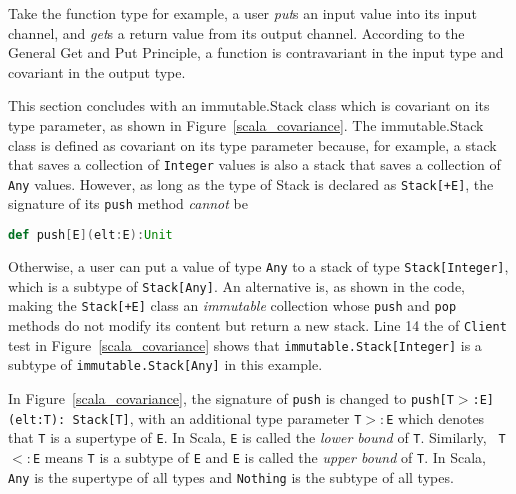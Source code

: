 Take the function type for example, a user {\it put}s an input value into 
its input channel, and {\it get}s a return value from its output channel.  
According to the General Get and Put Principle, a function is contravariant in 
the input type and covariant in the output type.

This section concludes with an immutable.Stack class which is covariant on its type 
parameter, as shown in Figure~\ref{scala_covariance}.  The immutable.Stack class 
is defined as covariant on  its type parameter because, for example, a stack 
that saves a collection of {\tt Integer} values is also a stack that saves a collection of {\tt Any} 
values.  However, as long as the type of Stack is declared as {\tt Stack[+E]}, the 
signature of its {\tt push} method {\it cannot} be
  \begin{lstlisting}[language=scala, escapechar=?]
  def push[E](elt:E):Unit
  \end{lstlisting}
Otherwise, a user can put a value of type {\tt Any}  to a stack of type {\tt Stack[Integer]},
which is a subtype of {\tt Stack[Any]}.  An alternative is, as shown 
in the code, making the {\tt Stack[+E]} class an {\it immutable} collection 
whose {\tt push} and {\tt pop} methods do not modify its content but return a 
new stack.   Line 14 the of {\tt Client} test in Figure~\ref{scala_covariance}
shows that  {\tt immutable.Stack[Integer]} is a subtype of {\tt immutable.Stack[Any]} in this example.

In Figure~\ref{scala_covariance}, the signature of 
{\tt push} is changed to {\tt push[T$>$:E](elt:T): Stack[T]}, with an additional 
type parameter {\tt T$>:$E} which denotes that {\tt T} is a supertype of {\tt E}. 
In Scala, {\tt E} is called the {\it lower bound} of {\tt T}.  Similarly, {\tt 
T$<:$E} means {\tt T} is a subtype of {\tt E} and {\tt E} is called the {\it 
upper bound} of {\tt T}.  In Scala, {\tt Any} is the supertype of all types 
and {\tt Nothing} is the subtype of all types.


\begin{comment}
The final code example of this section, given in Figure 
\ref{scala_covariance}, provides a working library in which the {\tt Stack} 
trait is covariant on its type parameter.  Different from Stacks in previous 
examples, the new stack is {\it immutable} in the sense that its {\tt push} and 
{\tt pop} methods do not modify its content but return a new stack.
\end{comment}


\newpage 

